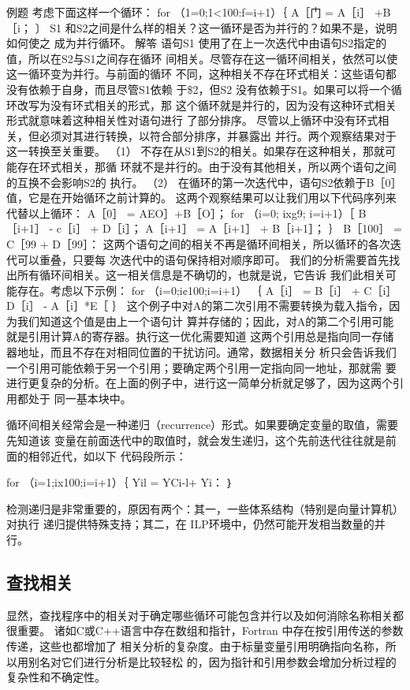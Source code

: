 例题
考虑下面这样一个循环：
for （1=0;1<100:f=i+1）｛
A［门 = A［i］ +B［i；
〕
S1 和S2之间是什么样的相关？这一循环是否为并行的？如果不是，说明如何使之
成为并行循环。
解笭
语句S1 使用了在上一次迭代中由语句S2指定的值，所以在S2与S1之间存在循环
间相关。尽管存在这一循环间相关，依然可以使这一循环变为并行。与前面的循环
不同，这种相关不存在环式相关：这些语句都没有依赖于自身，而且尽管S1依赖
于\$2，但S2 没有依赖于S1。如果可以将一个循环改写为没有环式相关的形式，那
这个循环就是并行的，因为没有这种环式相关形式就意味着这种相关性对语句进行
了部分排序。
尽管以上循环中没有环式相关，但必须对其进行转换，以符合部分排序，并暴露出
并行。两个观察结果对于这一转换至关重要。
（1） 不存在从S1到S2的相关。如果存在这种相关，那就可能存在环式相关，那循
环就不是并行的。由于没有其他相关，所以两个语句之间的互换不会影响S2的
执行。
（2） 在循环的第一次迭代中，语句S2依赖于B［0］值，它是在开始循环之前计算的。
这两个观察结果可以让我们用以下代码序列来代替以上循环：
A［0］ = AEO］+B［O］；
for （i=0; ixg9; i=i+1）［
B［i+1］ - c［i］ + D［i］；
A［i+1］ = A［i+1］ + B［i+1］；
｝
B［100］ = C［99 + D［99］：
这两个语句之间的相关不再是循环间相关，所以循环的各次迭代可以重叠，只要每
次迭代中的语句保持相对顺序即可。
我们的分析需要首先找出所有循环间相关。这一相关信息是不确切的，也就是说，它告诉
我们此相关可能存在。考虑以下示例：
for （i=0;i¢100;i=i+1） ｛
A［i］
= B［i］
+ C［i］
D［i］ - A［i］*E［
｝
这个例子中对A的第二次引用不需要转换为载入指令，因为我们知道这个值是由上一个语句计
算并存储的；因此，对A的第二个引用可能就是引用计算A的寄存器。执行这一优化需要知道
这两个引用总是指向同一存储器地址，而且不存在对相同位置的干扰访问。通常，数据相关分
析只会告诉我们一个引用可能依赖于另一个引用；要确定两个引用一定指向同一地址，那就需
要进行更复杂的分析。在上面的例子中，进行这一简单分析就足够了，因为这两个引用都处于
同一基本块中。

循环间相关经常会是一种递归（recurrence）形式。如果要确定变量的取值，需要先知道该
变量在前面迭代中的取值时，就会发生递归，这个先前迭代往往就是前面的相邻近代，如以下
代码段所示：

for （i=1;ix100;i=i+1）｛
Yil = YCi-l+ Yi：
｝

检测递归是非常重要的，原因有两个：其一，一些体系结构（特别是向量计算机）对执行
递归提供特殊支持；其二，在 ILP环境中，仍然可能开发相当数量的并行。

\subsection{查找相关}
显然，查找程序中的相关对于确定哪些循环可能包含并行以及如何消除名称相关都很重要。
诸如C或C++语言中存在数组和指针，Fortran 中存在按引用传送的参数传递，这些也都增加了
相关分析的复杂度。由于标量变量引用明确指向名称，所以用别名对它们进行分析是比较轻松
的，因为指针和引用参数会增加分析过程的复杂性和不确定性。

